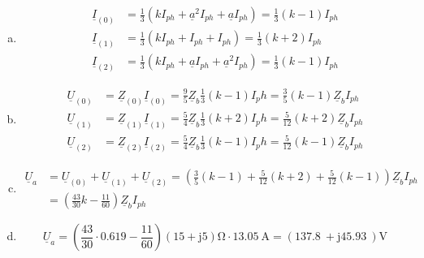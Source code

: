 ﻿\documentclass[a4paper,11pt]{scrartcl}
\newcommand{\mybr}[1]{\left(#1\right)}
\renewcommand{\j}{\mathrm{j}}
\newcommand{\Z}{\underline{Z}}
\newcommand{\U}{\underline{U}}
\newcommand{\I}{\underline{I}}
\newcommand{\0}{_{\mybr{0}}}
\newcommand{\1}{_{\mybr{1}}}
\newcommand{\2}{_{\mybr{2}}}
\renewcommand{\a}{\underline{a}}
\begin{document}
\begin{enumerate}[a)]
\item
\begin{align}
\I\0&=\frac{1}{3}\mybr{k I_{ph}+\a^2 I_{ph}+\a I_{ph}}=\frac{1}{3}\mybr{k-1}I_{ph}\\
\I\1&=\frac{1}{3}\mybr{k I_{ph}+I_{ph}+I_{ph}}=\frac{1}{3}\mybr{k+2}I_{ph}\\
\I\2&=\frac{1}{3}\mybr{k I_{ph}+\a I_{ph}+\a^2 I_{ph}}=\frac{1}{3}\mybr{k-1}I_{ph}
\end{align}
\item
\begin{align}
\U\0&=\Z\0\I\0=\frac{9}{5}\Z_b\frac{1}{3}\mybr{k-1}I_ph=\frac{3}{5}\mybr{k-1}\Z_b I_{ph}\\
\U\1&=\Z\1\I\1=\frac{5}{4}\Z_b\frac{1}{3}\mybr{k+2}I_ph=\frac{5}{12}\mybr{k+2}\Z_b I_{ph}\\
\U\2&=\Z\2\I\2=\frac{5}{4}\Z_b\frac{1}{3}\mybr{k-1}I_ph=\frac{5}{12}\mybr{k-1}\Z_b I_{ph}
\end{align}
\item
\begin{align}
\U_a&=\U\0+\U\1+\U\2=\mybr{\frac{3}{5}\mybr{k-1}+\frac{5}{12}\mybr{k+2}+\frac{5}{12}\mybr{k-1}}\Z_b I_{ph}\\
&=\mybr{\frac{43}{30}k-\frac{11}{60}}\Z_b I_{ph}
\end{align}
\item
\begin{equation}
\U_a=\mybr{\frac{43}{30}\cdot\SI{0,619}-\frac{11}{60}}\mybr{15+\j 5}\si{\ohm}\cdot\SI{13,05}{\ampere}=\mybr{\SI{137,8}{}+\j \SI{45,93}{}}\si{\volt}
\end{equation}
\end{enumerate}
\end{document}
